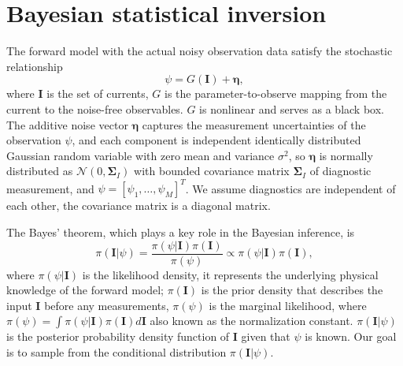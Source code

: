 \section{Bayesian statistical inversion}\label{sec:BSI}

The forward model with the actual noisy observation data satisfy the stochastic relationship 
%
\begin{equation}\label{eq:forward_model_1}
    \psi = G(\boldsymbol{I}) + \boldsymbol{\eta},
\end{equation}
%
where $\boldsymbol{I}$ is the set of currents, $G$ is the parameter-to-observe mapping from the current to the noise-free observables. $G$ is nonlinear and serves as a black box. The additive noise vector $\boldsymbol{\eta}$ captures the measurement uncertainties of the observation $\psi$, and each component is independent identically distributed Gaussian random variable with zero mean and variance $\sigma^2$, so $\boldsymbol{\eta}$ is normally distributed as $\mathcal{N}(0,\boldsymbol{\Sigma}_I)$ with bounded covariance matrix $\boldsymbol{\Sigma}_I$ of diagnostic measurement, and $\psi = [\psi_1,\ldots, \psi_M]^T$. We assume diagnostics are independent of each other, the covariance matrix is a diagonal matrix.


The Bayes’ theorem, which plays a key role in the Bayesian inference, is
%
\begin{equation}\label{eq:Bayes}
    \pi(\boldsymbol{I}|\psi) = \frac{ \pi(\psi|\boldsymbol{I})\pi \left(\boldsymbol{I}\right)}{\pi (\psi)}\propto \pi(\psi|\boldsymbol{I})\pi \left(\boldsymbol{I}\right),
\end{equation}
where $\pi(\psi|\boldsymbol{I})$ is the likelihood density, it represents the underlying physical knowledge of the forward model; $\pi \left(\boldsymbol{I}\right)$ is the prior density that describes the input $\boldsymbol{I}$ before any measurements, $\pi (\psi)$ is the marginal likelihood, where $\pi(\psi) = \int \pi(\psi|\boldsymbol{I})\pi(\boldsymbol{I}) d\boldsymbol{I}$ also known as the normalization constant.  $\pi(\boldsymbol{I}|\psi)$ is the posterior probability density function of $\boldsymbol{I}$ given that $\psi$ is known.  Our goal is to sample from the conditional distribution $\pi(\boldsymbol{I}|\psi)$.

